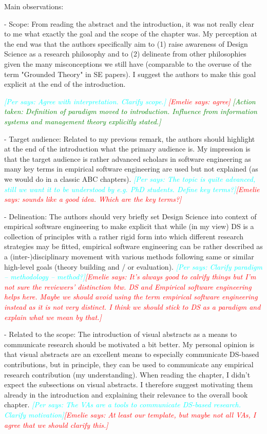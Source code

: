 \documentclass{article}
\newcommand{\emelie}[1]{\textcolor{red}{{\it [Emelie says: #1]}}}
\newcommand{\per}[1]{\textcolor{cyan}{{\it [Per says: #1]}}}
\newcommand{\action}[1]{\textcolor{green}{{\it [Action taken: #1]}}}
\newcommand{\emelie}[1]{}
\newcommand{\per}[1]{}
\newcommand{\action}[1]{}
\begin{document}
Main observations:

- Scope: From reading the abstract and the introduction, it was not really clear to me what exactly the goal and the scope of the chapter was. My perception at the end was that the authors specifically aim to (1) raise awareness of Design Science as a research philosophy and to (2) delineate from other philosophies given the many misconceptions we still have (comparable to the overuse of the term "Grounded Theory" in SE papers). I suggest the authors to make this goal explicit at the end of the introduction.

\per{Agree with interpretation. Clarify scope.}
\emelie{agree}
\action{Definition of paradigm moved to introduction. Influence from information systems and management theory explicitly stated.}

- Target audience: Related to my previous remark, the authors should highlight at the end of the introduction what the primary audience is. My impression is that the target audience is rather advanced scholars in software engineering as many key terms in empirical software engineering are used but not explained (as we would do in a classic ABC chapters).
\per{The topic is quite advanced, still we want it to be understood by e.g. PhD students. Define key terms?}\emelie{sounds like a good idea. Which are the key terms?}

- Delineation: The authors should very briefly set Design Science into context of empirical software engineering to make explicit that while (in my view) DS is a collection of principles with a rather rigid form into which different research strategies may be fitted, empirical software engineering can be rather described as a (inter-)disciplinary movement with various methods following same or similar high-level goals (theory building and / or evaluation). \per{Clarify paradigm -- methodology -- method?}\emelie{It's always good to calrify things but I'm not sure the reviewers' distinction btw. DS and Empirical software engineering helps here. Maybe we should avoid using the term empirical software engineering instead as it is not very distinct. I think we should stick to DS as a paradigm and explain what we mean by that.}

- Related to the scope: The introduction of visual abstracts as a means to communicate research should be motivated a bit better. My personal opinion is that visual abstracts are an excellent means to especially communicate DS-based contributions, but in principle, they can be used to communicate any empirical research contribution (my understanding). When reading the chapter, I didn't expect the subsections on visual abstracts. I therefore suggest motivating them already in the introduction and explaining their relevance to the overall book chapter. \per{The VAs are a tools to communicate DS-based research. Clarify motivation}\emelie{At least our template, but maybe not all VAs, I agree that we should clarify this.}
\end{document}
